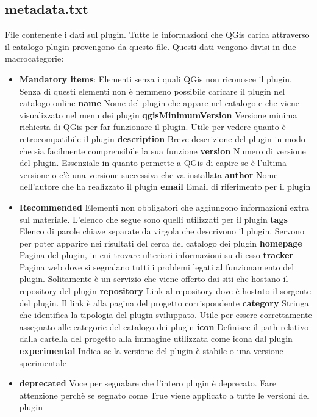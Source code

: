 \subsection{metadata.txt}
File contenente i dati sul plugin. Tutte le informazioni che QGis carica attraverso il catalogo plugin provengono da questo file.
Questi dati vengono divisi in due macrocategorie:
\begin{itemize}
	\item \textbf{Mandatory items}: Elementi senza i quali QGis non riconosce il plugin. Senza di questi elementi non è nemmeno possibile caricare il plugin nel catalogo online
		\subitem \textbf{name} Nome del plugin che appare nel catalogo e che viene visualizzato nel menu dei plugin
		\subitem \textbf{qgisMinimumVersion} Versione minima richiesta di QGis per far funzionare il plugin. Utile per vedere quanto è retrocompatibile il plugin
		\subitem \textbf{description} Breve descrizione del plugin in modo che sia facilmente comprensibile la sua funzione
		\subitem \textbf{version} Numero di versione del plugin. Essenziale in quanto permette a QGis di capire se è l'ultima versione o c'è una versione successiva che va installata
		\subitem \textbf{author} Nome dell'autore che ha realizzato il plugin
		\subitem \textbf{email} Email di riferimento per il plugin
	\item \textbf{Recommended} Elementi non obbligatori che aggiungono informazioni extra sul materiale. L'elenco che segue sono quelli utilizzati per il plugin
		\subitem \textbf{tags} Elenco di parole chiave separate da virgola che descrivono il plugin. Servono per poter apparire nei risultati del cerca del catalogo dei plugin
		\subitem \textbf{homepage} Pagina del plugin, in cui trovare ulteriori informazioni su di esso
		\subitem \textbf{tracker} Pagina web dove si segnalano tutti i problemi legati al funzionamento del plugin. Solitamente è un servizio che viene offerto dai siti che hostano il repository del plugin
		\subitem \textbf{repository} Link al repository dove è hostato il sorgente del plugin. Il link è alla pagina del progetto corrispondente
		\subitem \textbf{category} Stringa che identifica la tipologia del plugin sviluppato. Utile per essere correttamente assegnato alle categorie del catalogo dei plugin
		\subitem \textbf{icon} Definisce il path relativo dalla cartella del progetto alla immagine utilizzata come icona dal plugin
		\subitem \textbf{experimental} Indica se la versione del plugin è stabile o una versione sperimentale
	\item \textbf{deprecated} Voce per segnalare che l'intero plugin è deprecato. Fare attenzione perchè se segnato come True viene applicato a tutte le versioni del plugin
\end{itemize}

